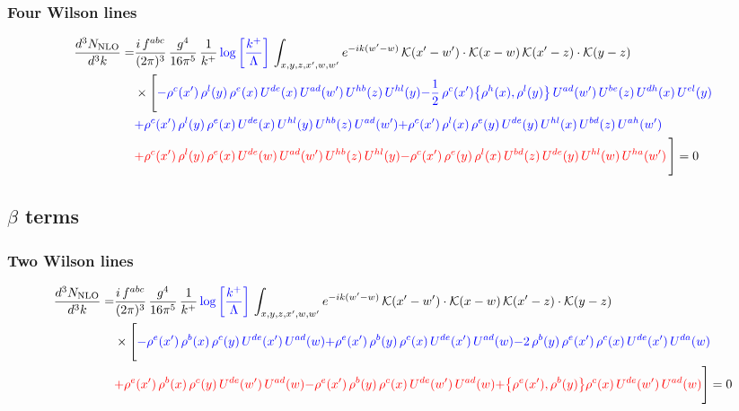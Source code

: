 \documentclass[9pt]{article}
\numberwithin{equation}{section}
\begin{document}
\subsubsection{Four Wilson lines}
\begin{align}
    \frac{d^{3}N_{\rm NLO}}{d^{3}k}= & \frac{i\,f^{abc}}{(2\pi)^{3}}\,\frac{g^{4}}{16\pi^{5}}\,\frac{1}{k^{+}}\,{\color{blue}\log{\left[\frac{k^{+}}{\Lambda}\right]}}\,\int_{x,y,z,x',w,w'}e^{-ik(w'-w)}\,\mathcal{K}(x'-w')\cdot\mathcal{K}(x-w)\,\mathcal{K}(x'-z)\cdot\mathcal{K}(y-z)\notag \\ & \times\Bigg[{\color{blue}-\rho^{c}(x')\,\rho^{l}(y)\,\rho^{e}(x)\,U^{de}(x)\,U^{ad}(w')\,U^{hb}(z)\,U^{hl}(y)}{\color{blue}-\frac{1}{2}\,\rho^{c}(x')\big\{\rho^{h}(x),\rho^{l}(y)\big\}\,U^{ad}(w')\,U^{be}(z)\,U^{dh}(x)\,U^{el}(y)}\notag \\ & {\color{blue}+\rho^{c}(x')\,\rho^{l}(y)\,\rho^{e}(x)\,U^{de}(x)\,U^{hl}(y)\,U^{hb}(z)\,U^{ad}(w')}{\color{blue}+\rho^{c}(x')\,\rho^{l}(x)\,\rho^{e}(y)\,U^{de}(y)\,U^{hl}(x)\,U^{bd}(z)\,U^{ah}(w')}\notag \\ &{\color{red}+\rho^{c}(x')\,\rho^{l}(y)\,\rho^{e}(x)\,U^{de}(w)\,U^{ad}(w')\,U^{hb}(z)\,U^{hl}(y)}{\color{red}-\rho^{c}(x')\,\rho^{e}(y)\,\rho^{l}(x)\,U^{bd}(z)\,U^{de}(y)\,U^{hl}(w)\,U^{ha}(w')}\,\Bigg] = 0
\end{align}
\subsection{$\beta$ terms}
\subsubsection{Two Wilson lines}
\begin{align}
    \frac{d^{3}N_{\rm NLO}}{d^{3}k}= & \frac{i\,f^{abc}}{(2\pi)^{3}}\,\frac{g^{4}}{16\pi^{5}}\,\frac{1}{k^{+}}\,{\color{blue}\log{\left[\frac{k^{+}}{\Lambda}\right]}}\,\int_{x,y,z,x',w,w'}e^{-ik(w'-w)}\,\mathcal{K}(x'-w')\cdot\mathcal{K}(x-w)\,\mathcal{K}(x'-z)\cdot\mathcal{K}(y-z)\notag \\ & \times\Bigg[{\color{blue}-\rho^{e}(x')\,\rho^{b}(x)\,\rho^{c}(y)\,U^{de}(x')\,U^{ad}(w)}{\color{blue}+\rho^{e}(x')\,\rho^{b}(y)\,\rho^{c}(x)\,U^{de}(x')\,U^{ad}(w)}{\color{blue}-2\,\rho^{b}(y)\,\rho^{e}(x')\, \rho^{c}(x)\, U^{de}(x')\,U^{da}(w)}\notag \\ & {\color{red}+\rho^{e}(x')\,\rho^{b}(x)\,\rho^{c}(y)\,U^{de}(w')\,U^{ad}(w)}{\color{red}-\rho^{e}(x')\,\rho^{b}(y)\,\rho^{c}(x)\,U^{de}(w')\,U^{ad}(w)}{\color{red}+\big\{\rho^{e}(x'),\rho^{b}(y)\big\}\rho^{c}(x)\,U^{de}(w')\,U^{ad}(w)}\Bigg] = 0
\end{align}   
\end{document}
